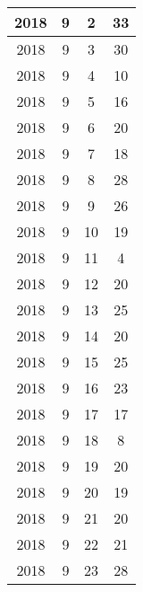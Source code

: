 \begin{longtable} {|c|c|c|c|}
\hline
2018         & 9            & 2            & 33                        \\ 
\hline
2018         & 9            & 3            & 30                        \\ 
\hline
2018         & 9            & 4            & 10                        \\ 
\hline
2018         & 9            & 5            & 16                        \\ 
\hline
2018         & 9            & 6            & 20                        \\ 
\hline
2018         & 9            & 7            & 18                        \\ 
\hline
2018         & 9            & 8            & 28                        \\ 
\hline
2018         & 9            & 9            & 26                        \\ 
\hline
2018         & 9            & 10           & 19                        \\ 
\hline
2018         & 9            & 11           & 4                         \\ 
\hline
2018         & 9            & 12           & 20                        \\ 
\hline
2018         & 9            & 13           & 25                        \\ 
\hline
2018         & 9            & 14           & 20                        \\ 
\hline
2018         & 9            & 15           & 25                        \\ 
\hline
2018         & 9            & 16           & 23                        \\ 
\hline
2018         & 9            & 17           & 17                        \\ 
\hline
2018         & 9            & 18           & 8                         \\ 
\hline
2018         & 9            & 19           & 20                        \\ 
\hline
2018         & 9            & 20           & 19                        \\ 
\hline
2018         & 9            & 21           & 20                        \\ 
\hline
2018         & 9            & 22           & 21                        \\ 
\hline
2018         & 9            & 23           & 28                        \\ 

\end{longtable}

